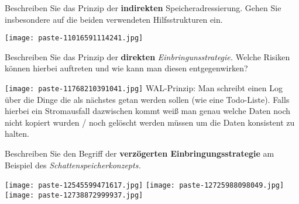 \documentclass{article}
\begin{document}
\begin{tcolorbox}[colback=white!10!white,colframe=lightgray!75!black,
  savelowerto=\jobname_ex.tex,breakable,enhanced,lines before break=40]

\begin{center}
 Beschreiben Sie das Prinzip der 
\textbf{indirekten
}Speicheradressierung. Gehen Sie insbesondere auf die beiden verwendeten Hilfsstrukturen ein. 

\end{center}

\tcblower

\justifying
\texttt{[image: paste-11016591114241.jpg]}

\end{tcolorbox}
\begin{tcolorbox}[colback=white!10!white,colframe=lightgray!75!black,
  savelowerto=\jobname_ex.tex,breakable,enhanced,lines before break=40]

\begin{center}
 Beschreiben Sie das Prinzip der 
\textbf{direkten
}\textit{Einbringunsstrategie.
}Welche Risiken können hierbei auftreten und wie kann man diesen entgegenwirken? 

\end{center}

\tcblower

\justifying
\texttt{[image: paste-11768210391041.jpg]}
WAL-Prinzip: Man schreibt einen Log über die Dinge die als nächstes getan werden sollen (wie eine Todo-Liste). Falls hierbei ein Stromausfall dazwischen kommt weiß man genau welche Daten noch nicht kopiert wurden / noch gelöscht werden müssen um die Daten konsistent zu halten.

\end{tcolorbox}
\begin{tcolorbox}[colback=white!10!white,colframe=lightgray!75!black,
  savelowerto=\jobname_ex.tex,breakable,enhanced,lines before break=40]

\begin{center}
 Beschreiben Sie den Begriff der
\textbf{verzögerten Einbringungsstrategie
}am Beispiel des 
\textit{Schattenspeicherkonzepts.
} 

\end{center}

\tcblower

\justifying
\texttt{[image: paste-12545599471617.jpg]}
\texttt{[image: paste-12725988098049.jpg]}
\texttt{[image: paste-12738872999937.jpg]}

\end{tcolorbox}
\end{document}
